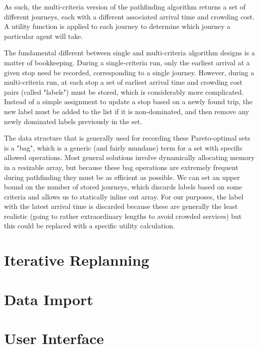 As such, the multi-criteria version of the pathfinding algorithm returns a set of different journeys, each with a different associated arrival time and crowding cost. A utility function is applied to each journey to determine which journey a particular agent will take.

The fundamental different between single and multi-criteria algorithm designs is a matter of bookkeeping. During a single-criteria run, only the earliest arrival at a given stop need be recorded, corresponding to a single journey. However, during a multi-criteria run, at each stop a set of earliest arrival time and crowding cost pairs (called "labels") must be stored, which is considerably more complicated. Instead of a simple assignment to update a stop based on a newly found trip, the new label must be added to the list if it is non-dominated, and then remove any newly dominated labels previously in the set.

The data structure that is generally used for recording these Pareto-optimal sets is a "bag", which is a generic (and fairly mundane) term for a set with specific allowed operations. Most general solutions involve dynamically allocating memory in a resizable array, but because these bag operations are extremely frequent during pathfinding they must be as efficient as possible. We can set an upper bound on the number of stored journeys, which discards labels based on some criteria and allows us to statically inline out array. For our purposes, the label with the latest arrival time is discarded because these are generally the least realistic (going to rather extraordinary lengths to avoid crowded services) but this could be replaced with a specific utility calculation.

\section{Iterative Replanning}


\section{Data Import}

\section{User Interface}

